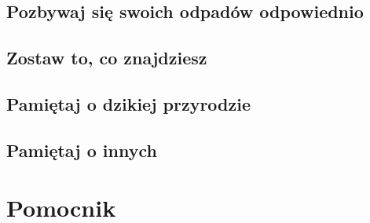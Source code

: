 \documentclass[11pt,fleqn]{book} %
\begin{document}
\lipsum


\chapter{Pozbywaj się swoich odpadów odpowiednio}
\label{rule3-trash}





\chapter{Zostaw to, co znajdziesz}
\label{rule5-leave}


\chapter{Pamiętaj o dzikiej przyrodzie}
\label{rule6-wildlife}


\chapter{Pamiętaj o innych}
\label{rule7-others}


\part{Pomocnik}
\end{document}
